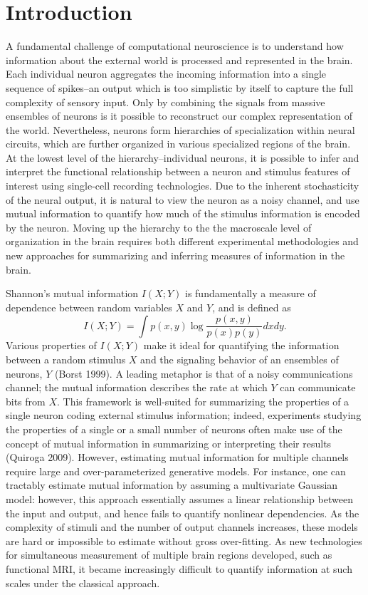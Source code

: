 \documentclass[12pt]{article}
\begin{document}
\section{Introduction}

A fundamental challenge of computational neuroscience is to understand
how information about the external world is processed and represented
in the brain. Each individual neuron aggregates the incoming
information into a single sequence of spikes--an output which is too
simplistic by itself to capture the full complexity of sensory
input. Only by combining the signals from massive ensembles of neurons
is it possible to reconstruct our complex representation of the
world. Nevertheless, neurons form hierarchies of specialization within
neural circuits, which are further organized in various specialized
regions of the brain.  At the lowest level of the hierarchy--individual neurons,
it is possible to infer and interpret the functional relationship between
a neuron and stimulus features of interest using single-cell recording technologies.
Due to the inherent stochasticity of the neural output, it is natural to
view the neuron as a noisy channel, and use mutual information
to quantify how much of the stimulus information is encoded by the neuron.
Moving up the hierarchy to the the macroscale level of organization in the
brain requires both different experimental methodologies and 
new approaches for summarizing and inferring measures of
information in the brain.

Shannon's mutual information $I(X; Y)$ is fundamentally a measure of
dependence between random variables $X$ and $Y$, and is defined as
\[
I(X;Y) = \int p(x, y) \log \frac{p(x, y)}{p(x)p(y)}dxdy.
\]
Various properties of $I(X; Y)$ make it ideal for quantifying the
information between a random stimulus $X$ and the signaling behavior
of an ensembles of neurons, $Y$ (Borst 1999).  A leading metaphor is
that of a noisy communications channel; the mutual information
describes the rate at which $Y$ can communicate bits from $X$.  This
framework is well-suited for summarizing the properties of a single
neuron coding external stimulus information; indeed, experiments
studying the properties of a single or a small number of neurons often
make use of the concept of mutual information in summarizing or
interpreting their results (Quiroga 2009). However, estimating mutual
information for multiple channels require large and over-parameterized
generative models.  For instance, one can tractably estimate mutual
information by assuming a multivariate Gaussian model: however, this
approach essentially assumes a linear relationship between the input
and output, and hence fails to quantify nonlinear dependencies.  As
the complexity of stimuli and the number of output channels increases,
these models are hard or impossible to estimate without gross
over-fitting.  As new technologies for simultaneous measurement of
multiple brain regions developed, such as functional MRI, it became
increasingly difficult to quantify information at such scales under
the classical approach.
 
\end{document}
